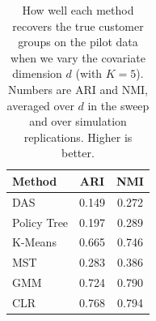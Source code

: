 \begin{table}[htbp]
\centering
\caption{How well each method recovers the true customer groups on the pilot data when we vary the covariate dimension $d$ (with $K=5$). Numbers are ARI and NMI, averaged over $d$ in the sweep and over simulation replications. Higher is better.}
\label{tab:app-ari-nmi-varying-d-avg}
\begin{tabular}{lcc}
\toprule
Method & ARI & NMI \\
\midrule
DAS & 0.149 & 0.272 \\
Policy Tree & 0.197 & 0.289 \\
K-Means & 0.665 & 0.746 \\
MST & 0.283 & 0.386 \\
GMM & 0.724 & 0.790 \\
CLR & 0.768 & 0.794 \\
\bottomrule
\end{tabular}
\end{table}
